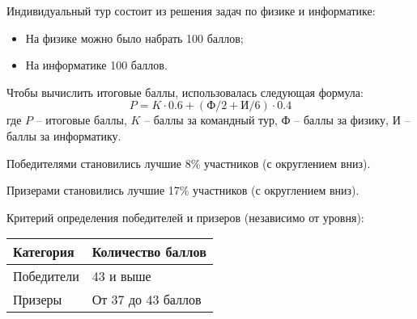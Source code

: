 Индивидуальный тур состоит из решения задач по физике и информатике:
\begin{itemize}
    \item На физике можно было набрать 100 баллов;
    \item На информатике 100 баллов.
\end{itemize}

Чтобы вычислить итоговые баллы, использовалась следующая формула:
$$P = K \cdot 0.6 + (\text{Ф}/2+\text{И}/6) \cdot 0.4$$
где $P$ – итоговые баллы, $K$ – баллы за командный тур, $\text{Ф}$ – баллы за физику, $\text{И}$ –
баллы за информатику.

Победителями становились лучшие 8\% участников (с округлением вниз).

Призерами становились лучшие 17\% участников (с округлением вниз).

Критерий определения победителей и призеров (независимо от уровня):
\begin{center}
    \begin{tabular}{|l|l|}
        \hline
        Категория& Количество баллов\\
        \hline
        Победители&43 и выше\\
        \hline
        Призеры&От 37 до 43 баллов \\
        \hline
    \end{tabular}
\end{center}

